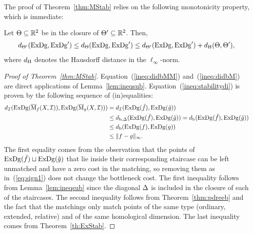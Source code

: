The proof of Theorem~\ref{thm:MStab} relies on the following monotonicity
property, which is immediate:
%
\begin{lem}\label{lem:ineqsub}
Let $\Theta\subseteq\mathbb{R}^2$ be in the closure of $\Theta'\subseteq\mathbb{R}^2$. 
Then, $$d_{\Theta'}(\mathrm{ExDg},\mathrm{ExDg}')\leq d_\Theta(\mathrm{ExDg},\mathrm{ExDg}')\leq d_{\Theta'}(\mathrm{ExDg},\mathrm{ExDg}')+d_{\rm H}(\Theta,\Theta'),$$
where $d_{\rm H}$ denotes the Hausdorff distance in the $\ell_\infty$-norm.
\end{lem}

\begin{proof}[Proof of Theorem~\ref{thm:MStab}]
Equation~(\ref{ineq:didbMM}) and~(\ref{ineq:didbM}) are direct applications of Lemma~\ref{lem:ineqsub}.
Equation~(\ref{ineq:stabilitydi}) is proven by the following sequence of (in)equalities:
%
\begin{align*}
d_{\mathcal{I}}(\mathrm{ExDg}(\overline{\mathrm{M}}_f(X,\mathcal{I})),\mathrm{ExDg}(\overline{\mathrm{M}}_g(X,\mathcal{I}))) &=d_{\mathcal{I}}(\mathrm{ExDg}(\tilde f), \mathrm{ExDg}(\tilde g))\\
&\leq d_{\rm{b},\Delta}(\mathrm{ExDg}(\tilde f), \mathrm{ExDg}(\tilde g))=d_{\rm b}(\mathrm{ExDg}(\tilde f), \mathrm{ExDg}(\tilde g))\\
&\leq d_{\rm b}(\mathrm{ExDg}(f),\mathrm{ExDg}(g))\\
&\leq \|f-g\|_\infty.
\end{align*}
%
The first equality comes from the observation that the points
of $\mathrm{ExDg}(\tilde f)\sqcup\mathrm{ExDg}(\tilde g)$ that lie inside
their corresponding staircase can be left unmatched and have a zero
cost in the matching, so removing them as in~(\ref{eq:sign1}) does not change the bottleneck cost. 
The first inequality follows from Lemma~\ref{lem:ineqsub} since the diagonal $\Delta$ is included in the closure of each of the staircases. 
The second inequality follows from Theorem~\ref{thm:pdreeb} and the fact that the matchings only match points of 
the same type (ordinary, extended, relative) and of the same homological dimension. The last inequality comes from  Theorem~\ref{th:ExStab}.
\end{proof}

